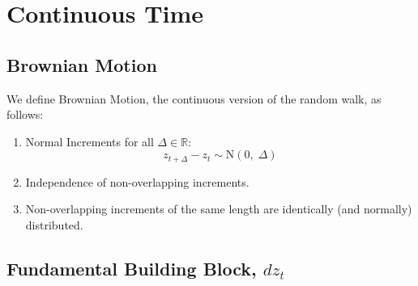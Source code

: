 \documentclass[a4paper,12pt]{scrartcl}
\begin{document}
\newpage
\section{Continuous Time}

\subsection{Brownian Motion}

We define Brownian Motion, the continuous version of the random walk,
as follows:
\begin{enumerate}
    \item Normal Increments for all $\Delta \in \mathbb{R}$:
	\[ z_{t+\Delta} - z_t \sim \text{N}(0, \; \Delta) \]
    \item Independence of non-overlapping increments.
    \item Non-overlapping increments of the same length are
	identically (and normally) distributed.
\end{enumerate}

\subsection{Fundamental Building Block, $dz_t$}
\end{document}
